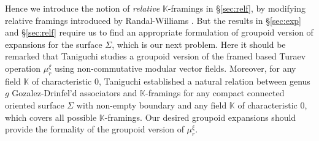 \documentclass[a4paper,12pt, twoside]{amsart}
\theoremstyle{definition}
\theoremstyle{remark}
\numberwithin{equation}{section}
\newcommand\bK{{\mathbb{K}}}
\begin{document}
Hence we introduce the notion of {\it relative} $\bK$-framings in \S\ref{sec:relf}, by modifying relative framings introduced by Randal-Williams \cite{RW14}. 
But the results in \S\ref{sec:exp} and \S\ref{sec:relf} require us to find an appropriate formulation of groupoid version of expansions for the surface $\Sigma$, which is our next problem. 
Here it should be remarked that Taniguchi \cite{Tan25b} studies a groupoid version of the framed based Turaev operation $\mu^\xi_r$ using non-commutative modular vector fields. 
Moreover, for any field $\bK$ of characteristic $0$, Taniguchi \cite{Tan25c} established a natural relation between genus $g$ Gozalez-Drinfel'd associators and $\bK$-framings for any compact connected oriented surface $\Sigma$ with non-empty boundary and any field $\bK$ of characteristic $0$, which covers all possible $\bK$-framings. 
Our desired groupoid expansions should provide the formality of the groupoid version of $\mu^\xi_r$. 
\par
\end{document}
